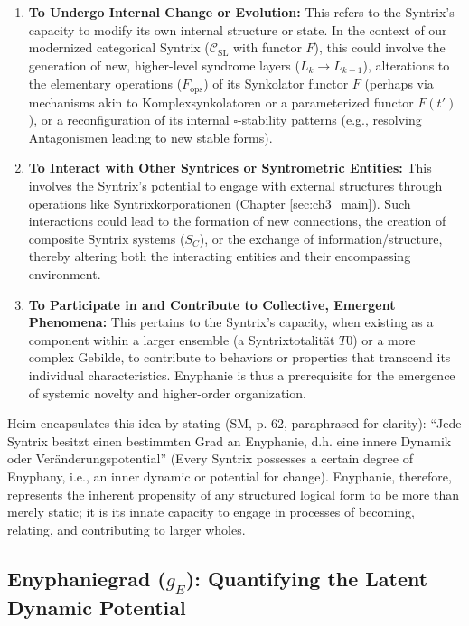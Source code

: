 \documentclass[
    12pt,              %
    a4paper,           %
    headings=normal,   %
    twoside=true,      %
    BCOR=8mm,          %
]{scrbook}
\newcommand{\q}[1]{\enquote{#1}}
\newcommand{\enyphaniegrad}{g_E}
\newcommand{\syntrixtotalitaet}{T0}
\newcommand{\BoxSyn}{\square}
\newcommand{\fops}{F_{\text{ops}}}
\begin{document}
\begin{enumerate}[label=(\alph*)]
    \item  \textbf{To Undergo Internal Change or Evolution:} This refers to the Syntrix's capacity to modify its own internal structure or state. In the context of our modernized categorical Syntrix (\(\mathcal{C}_{\text{SL}}\) with functor \(F\)), this could involve the generation of new, higher-level syndrome layers (\(L_k \to L_{k+1}\)), alterations to the elementary operations (\(\fops\)) of its Synkolator functor \(F\) (perhaps via mechanisms akin to Komplexsynkolatoren or a parameterized functor \(F(t')\)), or a reconfiguration of its internal \(\BoxSyn\)-stability patterns (e.g., resolving Antagonismen leading to new stable forms).
    \item  \textbf{To Interact with Other Syntrices or Syntrometric Entities:} This involves the Syntrix's potential to engage with external structures through operations like Syntrixkorporationen (Chapter \ref{sec:ch3_main}). Such interactions could lead to the formation of new connections, the creation of composite Syntrix systems (\(S_C\)), or the exchange of information/structure, thereby altering both the interacting entities and their encompassing environment.
    \item  \textbf{To Participate in and Contribute to Collective, Emergent Phenomena:} This pertains to the Syntrix's capacity, when existing as a component within a larger ensemble (a Syntrixtotalität \(\syntrixtotalitaet\)) or a more complex Gebilde, to contribute to behaviors or properties that transcend its individual characteristics. Enyphanie is thus a prerequisite for the emergence of systemic novelty and higher-order organization.
\end{enumerate}
Heim encapsulates this idea by stating (SM, p. 62, paraphrased for clarity): \q{Jede Syntrix besitzt einen bestimmten Grad an Enyphanie, d.h. eine innere Dynamik oder Veränderungspotential} (Every Syntrix possesses a certain degree of Enyphany, i.e., an inner dynamic or potential for change). Enyphanie, therefore, represents the inherent propensity of any structured logical form to be more than merely static; it is its innate capacity to engage in processes of becoming, relating, and contributing to larger wholes.

\subsection{Enyphaniegrad (\(\enyphaniegrad\)): Quantifying the Latent Dynamic Potential}
\label{sec:ch4_enyphaniegrad_quantifying_revised} 
\end{document}
